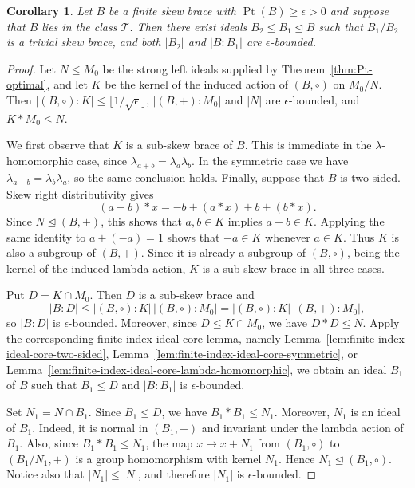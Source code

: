 \documentclass[11pt, oneside]{amsart}
\numberwithin{equation}{section}
\theoremstyle{plain}
\newtheorem{cor}[equation]{Corollary}
\theoremstyle{definition}
\newcommand{\Pt}{\operatorname{Pt} }
\begin{document}
\begin{cor} %
Let $B$ be a finite skew brace with $\Pt(B)\geqslant\epsilon>0$ and suppose that $B$ lies in the class $\mathcal{T}$. Then there exist ideals $B_2\leqslant B_1\trianglelefteq B$ such that $B_1/B_2$ is a trivial skew brace, and both $|B_2|$ and $|B:B_1|$ are $\epsilon$-bounded.
\end{cor}

\begin{proof}
Let $N\leqslant M_0$ be the strong left ideals supplied by Theorem~\ref{thm:Pt-optimal}, and let
$K$ be the kernel of the induced action of $(B,\circ)$ on $M_0/N$. Then
$|(B,\circ):K|\leqslant\lfloor1/\sqrt{\epsilon}\rfloor$, $|(B,+):M_0|$ and $|N|$ are $\epsilon$-bounded, and $K*M_0\leqslant N$.

We first observe that $K$ is a sub-skew brace of $B$. This is immediate in the $\lambda$-homomorphic case, since $\lambda_{a+b}=\lambda_a\lambda_b$. In the symmetric case we have $\lambda_{a+b}=\lambda_b\lambda_a$, so the same conclusion holds. Finally, suppose that $B$ is two-sided. Skew right distributivity gives
$$
(a+b)*x=-b+(a*x)+b+(b*x).
$$
Since $N\unlhd(B,+)$, this shows that $a,b\in K$ implies $a+b\in K$. Applying the same identity to $a+(-a)=1$ shows that $-a\in K$ whenever $a\in K$. Thus $K$ is also a subgroup of $(B,+)$. Since it is already a subgroup of $(B,\circ)$, being the kernel of the induced lambda action, $K$ is a sub-skew brace in all three cases.

Put $D=K\cap M_0$. Then $D$ is a sub-skew brace and
$$
|B:D|
\leqslant |(B,\circ):K|\,|(B,\circ):M_0|
=
|(B,\circ):K|\,|(B,+):M_0|,
$$
so $|B:D|$ is $\epsilon$-bounded. Moreover, since $D\leqslant K\cap M_0$, we have $D*D\leqslant N$.
Apply the corresponding finite-index ideal-core lemma, namely Lemma~\ref{lem:finite-index-ideal-core-two-sided}, Lemma~\ref{lem:finite-index-ideal-core-symmetric}, or Lemma~\ref{lem:finite-index-ideal-core-lambda-homomorphic}, we obtain an ideal $B_1$ of $B$ such that $B_1\leqslant D$ and $|B:B_1|$ is $\epsilon$-bounded.

Set $N_1=N\cap B_1$. Since $B_1\leqslant D$, we have $B_1*B_1\leqslant N_1$. Moreover, $N_1$ is an ideal of $B_1$. Indeed, it is normal in $(B_1,+)$ and invariant under the lambda action of $B_1$. Also, since $B_1*B_1\leqslant N_1$, the map
$x\mapsto x+N_1$ from $(B_1,\circ)$ to $(B_1/N_1,+)$ is a group homomorphism with kernel $N_1$. Hence $N_1\unlhd(B_1,\circ)$. Notice also that $|N_1|\leqslant|N|$, and therefore $|N_1|$ is $\epsilon$-bounded.


\end{proof}
\end{document}
